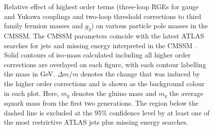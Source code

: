 \documentclass[final,3p,times,pdflatex]{elsarticle}
\begin{document}
\begin{figure}
\caption{\label{fig:cmssm} Relative effect of highest order terms (three-loop
  RGEs for gauge and Yukawa couplings and two-loop threshold corrections to
  third family fermion masses and $g_3$) on various
  particle pole masses in the CMSSM. The CMSSM 
  parameters coincide with the latest ATLAS searches for jets and missing
  energy interpreted in the 
  CMSSM~\cite{ATLAS-CONF-2013-047,Aad:2013wta}.
  Solid contours of iso-mass calculated including all higher order corrections
  are   overlayed on each 
  figure, with each contour labelling the mass in GeV. $\Delta m/m$ denotes
  the change that was induced by the higher order corrections and is shown as
  the background colour in each plot. 
  Here, $m_g$ denotes the
  gluino mass and $m_q$ the average squark mass from the first two 
  generations. The region below the dashed line is excluded at the 95$\%$
  confidence level by at least one of the most restrictive ATLAS jets plus
  missing energy searches.}
\end{figure}
\end{document}
